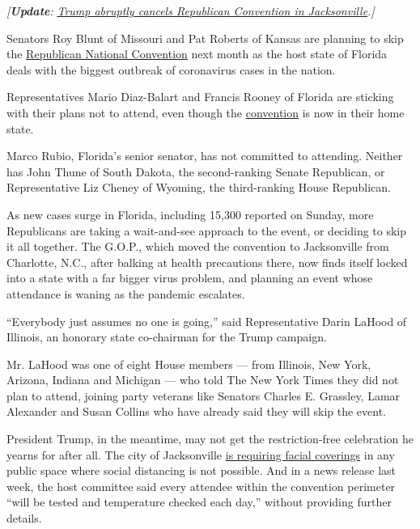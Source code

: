 \emph{{[}\textbf{\textbf{Update}}:}
\href{https://www.nytimes3xbfgragh.onion/2020/07/23/us/politics/jacksonville-rnc.html}{\emph{Trump
abruptly cancels Republican Convention in Jacksonville}}\emph{.{]}}

Senators Roy Blunt of Missouri and Pat Roberts of Kansas are planning to
skip the
\href{https://www.nytimes3xbfgragh.onion/2020/07/14/us/politics/republican-convention-jacksonville-virus-outdoors.html}{Republican
National Convention} next month as the host state of Florida deals with
the biggest outbreak of coronavirus cases in the nation.

Representatives Mario Diaz-Balart and Francis Rooney of Florida are
sticking with their plans not to attend, even though the
\href{https://www.nytimes3xbfgragh.onion/2020/07/14/us/politics/republican-convention-jacksonville-virus-outdoors.html}{convention}
is now in their home state.

Marco Rubio, Florida's senior senator, has not committed to attending.
Neither has John Thune of South Dakota, the second-ranking Senate
Republican, or Representative Liz Cheney of Wyoming, the third-ranking
House Republican.

As new cases surge in Florida, including 15,300 reported on Sunday, more
Republicans are taking a wait-and-see approach to the event, or deciding
to skip it all together. The G.O.P., which moved the convention to
Jacksonville from Charlotte, N.C., after balking at health precautions
there, now finds itself locked into a state with a far bigger virus
problem, and planning an event whose attendance is waning as the
pandemic escalates.

``Everybody just assumes no one is going,'' said Representative Darin
LaHood of Illinois, an honorary state co-chairman for the Trump
campaign.

Mr. LaHood was one of eight House members --- from Illinois, New York,
Arizona, Indiana and Michigan --- who told The New York Times they did
not plan to attend, joining party veterans like Senators Charles E.
Grassley, Lamar Alexander and Susan Collins who have already said they
will skip the event.

President Trump, in the meantime, may not get the restriction-free
celebration he yearns for after all. The city of Jacksonville
\href{https://www.nytimes3xbfgragh.onion/2020/06/29/us/politics/rnc-masks-convention.html}{is
requiring facial coverings} in any public space where social distancing
is not possible. And in a news release last week, the host committee
said every attendee within the convention perimeter ``will be tested and
temperature checked each day,'' without providing further details.

